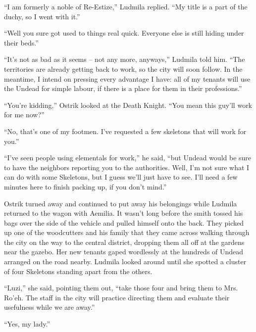  

“I am formerly a noble of Re-Estize,” Ludmila replied. “My title is a part of the duchy, so I went with it.”

 

“Well you sure got used to things real quick. Everyone else is still hiding under their beds.”

 

“It’s not as bad as it seems – not any more, anyways,” Ludmila told him. “The territories are already getting back to work, so the city will soon follow. In the meantime, I intend on pressing every advantage I have: all of my tenants will use the Undead for simple labour, if there is a place for them in their professions.”

 

“You’re kidding,” Ostrik looked at the Death Knight. “You mean this guy’ll work for me now?”

 

“No, that’s one of my footmen. I’ve requested a few skeletons that will work for you.”

 

“I’ve seen people using elementals for work,” he said, “but Undead would be sure to have the neighbors reporting you to the authorities. Well, I’m not sure what I can do with some Skeletons, but I guess we’ll just have to see. I’ll need a few minutes here to finish packing up, if you don’t mind.”

 

Ostrik turned away and continued to put away his belongings while Ludmila returned to the wagon with Aemilia. It wasn’t long before the smith tossed his bags over the side of the vehicle and pulled himself onto the back. They picked up one of the woodcutters and his family that they came across walking through the city on the way to the central district, dropping them all off at the gardens near the gazebo. Her new tenants gaped wordlessly at the hundreds of Undead arranged on the road nearby. Ludmila looked around until she spotted a cluster of four Skeletons standing apart from the others.

 

“Luzi,” she said, pointing them out, “take those four and bring them to Mrs. Ro’eh. The staff in the city will practice directing them and evaluate their usefulness while we are away.”

 

“Yes, my lady.”

 

